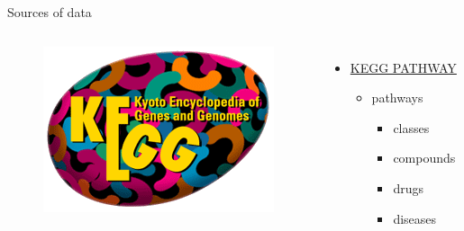 \documentclass{beamer}
\begin{document}
\begin{frame}{Sources of data}
\begin{columns}[c]
\begin{figure}
    \centering
    \includegraphics[width=0.9\linewidth]{kegg_logo.png}
\end{figure}
\begin{itemize}
    \item \href{https://www.genome.jp/kegg/pathway.html}{KEGG PATHWAY}
    \begin{itemize}
        \item pathways
        \begin{itemize}
            \item classes
            \item compounds
            \item drugs
            \item diseases
        \end{itemize}
    \end{itemize}
\end{itemize}

\end{columns}
\end{frame}
\end{document}
